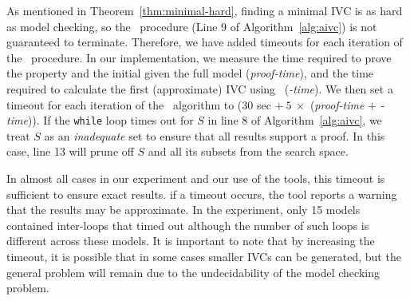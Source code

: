 As mentioned in Theorem~\ref{thm:minimal-hard}, finding a minimal IVC is as hard as model checking,
so the \getivc\ procedure (Line 9 of Algorithm~\ref{alg:aivc}) is not guaranteed to
terminate.
Therefore, we have added timeouts for each iteration of the \aivcalg\ procedure.
In our implementation, we measure the time required to prove the property and the initial
given the full model (\emph{proof-time}), and the time required to calculate the first
(approximate) IVC using \ucalg\ (\emph{\ucalg-time}).
We then set a timeout for each iteration of the \aivcalg\ algorithm to
($30$ sec  $+\ 5\ \times$ (\emph{proof-time} $+$ \emph{\ucalg-time})).
If the \texttt{while} loop times out for $S$ in line 8 of Algorithm~\ref{alg:aivc},
we treat $S$ as an \emph{inadequate} set to ensure that all results support a proof.
In this case, line 13 will prune off $S$ and all
its subsets from the search space.

In almost all cases
in our experiment and our use of the tools, this timeout is sufficient to ensure exact
results. if a timeout occurs, the tool reports a warning that the results may be
approximate. In the experiment, only 15 models contained inter-loops that timed out although the number of such loops is different across these models.
It is important to note that by increasing the timeout, it is possible that
in some cases smaller IVCs can be generated, but the general problem will remain due
to the undecidability of the model checking problem.




%

